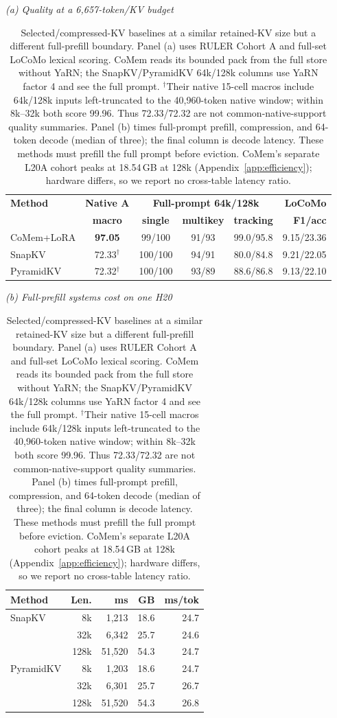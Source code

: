 \begin{table}[!t]
\centering
\small
\setlength{\tabcolsep}{3.2pt}
\begin{minipage}[t]{\textwidth}
\centering
\textit{(a) Quality at a 6,657-token/KV budget}\\[-2pt]
\setlength{\tabcolsep}{5pt}
\begin{tabular}{@{}lccccr@{}}
\toprule
\textbf{Method} & \textbf{Native A} & \multicolumn{3}{c}{\textbf{Full-prompt 64k/128k}} & \textbf{LoCoMo} \\
& \textbf{macro} & \textbf{single} & \textbf{multikey} & \textbf{tracking} & \textbf{F1/acc} \\
\midrule
CoMem+LoRA & \textbf{97.05} & 99/100 & 91/93 & 99.0/95.8 & 9.15/23.36 \\
SnapKV & 72.33$^{\dagger}$ & 100/100 & 94/91 & 80.0/84.8 & 9.21/22.05 \\
PyramidKV & 72.32$^{\dagger}$ & 100/100 & 93/89 & 88.6/86.8 & 9.13/22.10 \\
\bottomrule
\end{tabular}
\end{minipage}

\vspace{6pt}
\begin{minipage}[t]{\textwidth}
\centering
\textit{(b) Full-prefill systems cost on one H20}\\[-2pt]
\setlength{\tabcolsep}{6pt}
\begin{tabular}{@{}lrrrr@{}}
\toprule
\textbf{Method} & \textbf{Len.} & \textbf{ms} & \textbf{GB} & \textbf{ms/tok} \\
\midrule
SnapKV & 8k & 1,213 & 18.6 & 24.7 \\
& 32k & 6,342 & 25.7 & 24.6 \\
& 128k & 51,520 & 54.3 & 24.7 \\
PyramidKV & 8k & 1,203 & 18.6 & 24.7 \\
& 32k & 6,301 & 25.7 & 26.7 \\
& 128k & 51,520 & 54.3 & 26.8 \\
\bottomrule
\end{tabular}
\end{minipage}
\caption{Selected/compressed-KV baselines at a similar retained-KV size but a
different full-prefill boundary.
Panel (a) uses RULER Cohort A and full-set LoCoMo lexical scoring. CoMem reads
its bounded pack from the full store without YaRN; the SnapKV/PyramidKV 64k/128k
columns use YaRN factor 4 and see the full prompt. $^{\dagger}$Their native
15-cell macros include 64k/128k inputs left-truncated to the 40,960-token native
window; within 8k--32k both score 99.96. Thus 72.33/72.32 are not
common-native-support quality summaries. Panel (b) times full-prompt prefill,
compression, and 64-token decode (median of three); the final column is decode
latency. These methods must prefill the full prompt before eviction. CoMem's
separate L20A cohort peaks at 18.54\,GB at 128k
(Appendix~\ref{app:efficiency}); hardware differs, so we report no cross-table latency
ratio.}
\label{tab:kvcompress}
\end{table}

